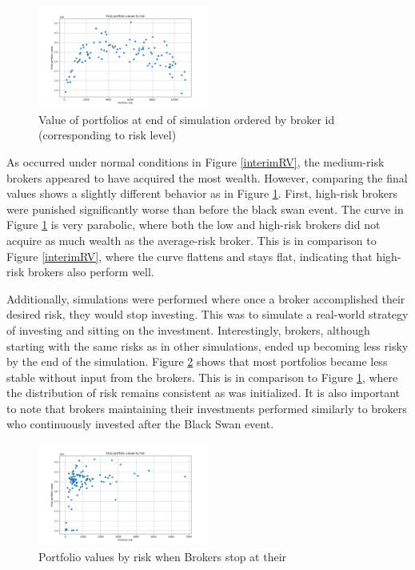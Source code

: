 \documentclass[letterpaper, 11 pt, proceedings]{IEEEtran}
\begin{document}
	\begin{figure}[h]
		\centering
		\includegraphics[width=0.5\textwidth]{valueToRisk.png}
		\caption{Value of portfolios at end of simulation ordered by broker id (corresponding to risk level)}
		\label{RV}
	\end{figure}
	\FloatBarrier

	As occurred under normal conditions in Figure \ref{interimRV}, the medium-risk brokers appeared to have acquired the most wealth. However, comparing the final values shows a slightly different behavior as in Figure \ref{RV}. First, high-risk brokers were punished significantly worse than before the black swan event. The curve in Figure \ref{RV} is very parabolic, where both the low and high-risk brokers did not acquire as much wealth as the average-risk broker. This is in comparison to Figure \ref{interimRV}, where the curve flattens and stays flat, indicating that high-risk brokers also perform well.
	
	Additionally, simulations were performed where once a broker accomplished their desired risk, they would stop investing. This was to simulate a real-world strategy of investing and sitting on the investment. Interestingly, brokers, although starting with the same risks as in other simulations, ended up becoming less risky by the end of the simulation. Figure \ref{stopatstable} shows that most portfolios became less stable without input from the brokers. This is in comparison to Figure \ref{RV}, where the distribution of risk remains consistent as was initialized. It is also important to note that brokers maintaining their investments performed similarly to brokers who continuously invested after the Black Swan event.

	\begin{figure}[h]
		\centering
		\includegraphics[width=0.5\textwidth]{valueToRisk_stopatstable.png}
		\caption{Portfolio values by risk when Brokers stop at their }
		\label{stopatstable}
	\end{figure}
	\FloatBarrier
\end{document}
